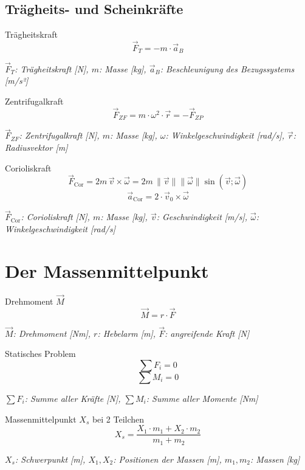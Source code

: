 \documentclass[a4paper,10pt]{article}
\newenvironment{displayformula}
{
	\begin{framed}
		\color{formulaColor}
	}
	{\end{framed}}
\newcommand{\formulalegend}[1]{%
	\par\vspace{0.5ex}%
	{{\color{legendColor}\RaggedRight\small\textit{#1}}}%
	\par\vspace{1.5ex}%
}
\begin{document}
\subsection{Trägheits- und Scheinkräfte}

\begin{displayformula}
	Trägheitskraft
	\[
	\vec{F}_T = -m \cdot \vec{a}_B
	\]
\end{displayformula}
\formulalegend{
	\( \vec{F}_T \): Trägheitskraft [N], \( m \): Masse [kg], \( \vec{a}_B \): Beschleunigung des Bezugssystems [m/s²]
}

\begin{displayformula}
	Zentrifugalkraft
	\[
	\vec{F}_{ZF} = m \cdot \omega^2 \cdot \vec{r} = - \vec{F}_{ZP}
	\]
\end{displayformula}
\formulalegend{
	\( \vec{F}_{ZF} \): Zentrifugalkraft [N], \( m \): Masse [kg], \( \omega \): Winkelgeschwindigkeit [rad/s], \( \vec{r} \): Radiusvektor [m]
}

\begin{displayformula}
	Corioliskraft
	\[
	\vec{F}_{\mathrm{Cor}} = 2m\, \vec{v} \times \vec{\omega} = 2m\, \lVert \vec{v} \rVert \lVert \vec{\omega} \rVert \sin(\vec{v}; \vec{\omega})
	\]
	\[
	\vec{a}_{\mathrm{Cor}} = 2 \cdot \vec{v}_0 \times \vec{\omega}
	\]
\end{displayformula}
\formulalegend{
	\( \vec{F}_{\mathrm{Cor}} \): Corioliskraft [N], \( m \): Masse [kg], \( \vec{v} \): Geschwindigkeit [m/s], \( \vec{\omega} \): \\ Winkelgeschwindigkeit [rad/s]
}


\section{Der Massenmittelpunkt}

\begin{displayformula}
	Drehmoment \( \vec{M} \)
	\[
	\vec{M} = r \cdot \vec{F}
	\]
\end{displayformula}
\formulalegend{
	\( \vec{M} \): Drehmoment [Nm], \( r \): Hebelarm [m], \( \vec{F} \): angreifende Kraft [N]
}

\begin{displayformula}
	Statisches Problem
	\[
	\sum F_i = 0
	\]
	\[
	\sum M_i = 0
	\]
\end{displayformula}
\formulalegend{
	\( \sum F_i \): Summe aller Kräfte [N], \( \sum M_i \): Summe aller Momente [Nm]
}

\begin{displayformula}
	Massenmittelpunkt \( X_s \) bei 2 Teilchen
	\[
	X_s = \frac{X_1 \cdot m_1 + X_2 \cdot m_2}{m_1 + m_2}
	\]
\end{displayformula}
\formulalegend{
	\( X_s \): Schwerpunkt [m], \( X_1, X_2 \): Positionen der Massen [m], \( m_1, m_2 \): Massen [kg]
}
\end{document}
